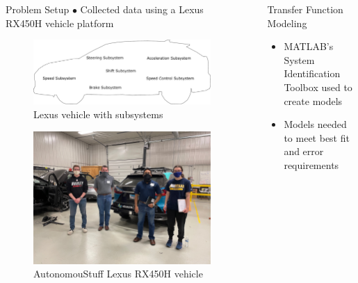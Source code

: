 \documentclass[final]{beamer}
\newlength{\sepwid}
\newlength{\onecolwid}
\begin{document}
\begin{frame}[t]
\begin{columns}[t]
\begin{column}{\onecolwid}
\begin{alertblock}{Problem Setup}
$\bullet$ Collected data using a Lexus RX450H vehicle platform  

\begin{figure}
	\centering
	\includegraphics[width=0.48\linewidth]{figs/inkscape/carSystemModelOutline}
	\caption{Lexus vehicle with subsystems}
\end{figure}

\begin{figure}
	\centering
	\includegraphics[width=0.48\linewidth]{figs/img/picturesVisitToAStuff/visitors1-20211007}
	\caption{AutonomouStuff Lexus RX450H vehicle}
\end{figure}

\vskip -1cm
\end{alertblock}

\end{column} %

\begin{column}{\sepwid}\end{column} %

\begin{column}{\onecolwid} %


\begin{alertblock}{Transfer Function Modeling}
\vskip 0.5cm
\begin{itemize}
    \item MATLAB's System Identification Toolbox used to create models 
    \item Models needed to meet best fit and error requirements 


\end{itemize}
\end{alertblock}
\end{column}
\end{columns}
\end{frame}
\end{document}
